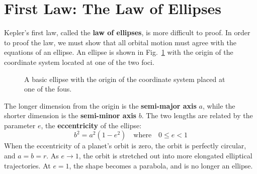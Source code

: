 \documentclass{../../../oss-handout}
\begin{document}
\section{First Law: The Law of Ellipses}
Kepler's first law, called the \textbf{law of ellipses}, is more difficult to
proof. In order to proof the
law, we must show that all orbital motion must agree with the equations of an
ellipse. An ellipse is shown in Fig.~\ref{ellipse1} with the origin of the
coordinate system located at one of the two foci.
\begin{figure}[!ht]
  \centering
  \caption{A basic ellipse with the origin of the coordinate system placed at
    one of the fous.}
  \label{ellipse1}
\end{figure}

The longer dimension from the origin is the \textbf{semi-major axis} $a$, while
the shorter dimension is the \textbf{semi-minor axis} $b$. The two lengths are
related by the parameter $e$, the \textbf{eccentricity} of the ellipse:
\begin{equation}
  b^2=a^2(1-e^2)\quad\text{where}\quad 0\leq e < 1
\end{equation}
When the eccentricity of a planet's orbit is zero, the orbit is perfectly
circular, and $a=b=r$. As $e\rightarrow 1$, the orbit is stretched out into
more elongated elliptical trajectories.
At $e=1$, the shape becomes a parabola, and is no longer an ellipse.
\end{document}
